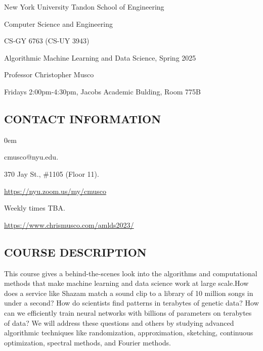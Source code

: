 \documentclass[10pt]{article}
\begin{document}
\begin{center}
	\normalsize
	New York University Tandon School of Engineering
	
	Computer Science and Engineering
	\medskip
	
	\large
	CS-GY 6763 (CS-UY 3943)
	 
	Algorithmic Machine Learning and Data Science, Spring 2025
	\medskip
	
	\normalsize
	Professor Christopher Musco
	
	Fridays 2:00pm-4:30pm, Jacobs Academic Bulding, Room 775B
\end{center} 

\subsection{CONTACT INFORMATION}
\begin{description}\itemsep0em 
	\item[Email:] cmusco@nyu.edu.
	\item[Office:] 370 Jay St., \#1105 (Floor 11).
	\item[Virtual Zoom Office:] \url{https://nyu.zoom.us/my/cmusco}
	\item[Office Hours:] Weekly times TBA.
	\item[Course Webspage:] \url{https://www.chrismusco.com/amlds2023/}
\end{description} 

\subsection{COURSE DESCRIPTION}
This course gives a behind-the-scenes look into the algorithms and computational methods that make machine learning and data science work at large scale.How does a service like Shazam match a sound clip to a library of 10 million songs in under a second? How do scientists find patterns in terabytes of genetic data? How can we efficiently train neural networks with billions of parameters on terabytes of data? We will address these questions and others by studying advanced algorithmic techniques like randomization, approximation, sketching, continuous optimization, spectral methods, and Fourier methods.
\end{document}
